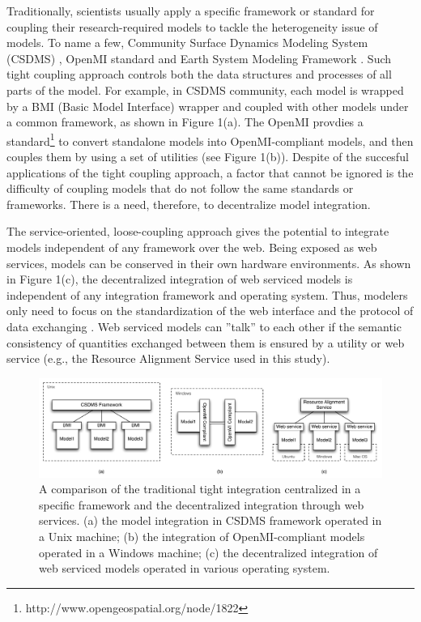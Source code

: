 \documentclass[review]{elsarticle}
\begin{document}
Traditionally, scientists usually apply a specific framework or standard for coupling their research-required models to tackle the heterogeneity issue of models. To name a few, Community Surface Dynamics Modeling System (CSDMS) \citep{peckham2013}, OpenMI standard \citep{moore2005} and Earth System Modeling Framework \citep{hill2004}. Such tight coupling approach controls both the data structures and processes of all parts of the model. For example, in CSDMS community, each model is wrapped by a BMI (Basic Model Interface) wrapper and coupled with other models under a common framework, as shown in Figure 1(a). The OpenMI provdies a standard\footnote{http://www.opengeospatial.org/node/1822} to convert standalone models into OpenMI-compliant models, and then couples them by using a set of utilities (see Figure 1(b)). Despite of the succesful applications of the tight coupling approach, a factor that cannot be ignored is the difficulty of coupling models that do not follow the same standards or frameworks. There is a need, therefore, to decentralize model integration.

The service-oriented, loose-coupling approach gives the potential to integrate models independent of any framework over the web. Being exposed as web services, models can be conserved in their own hardware environments. As shown in Figure 1(c), the decentralized integration of web serviced models is independent of any integration framework and operating system. Thus, modelers only need to focus on the standardization of the web interface and the protocol of data exchanging \citep{goodall2013}. Web serviced models can ''talk'' to each other if the semantic consistency of quantities exchanged between them is ensured by a utility or web service (e.g., the Resource Alignment Service used in this study).

\begin{figure}[!htbp]
\centering
\includegraphics[scale=0.5]{../figures/comparison.pdf}
\caption{A comparison of the traditional tight integration centralized in a specific framework and the decentralized integration through web services. (a) the model integration in CSDMS framework operated in a Unix machine; (b) the integration of OpenMI-compliant models operated in a Windows machine; (c) the decentralized integration of web serviced models operated in various operating system.}
\label{comparison}
\end{figure}
\end{document}
